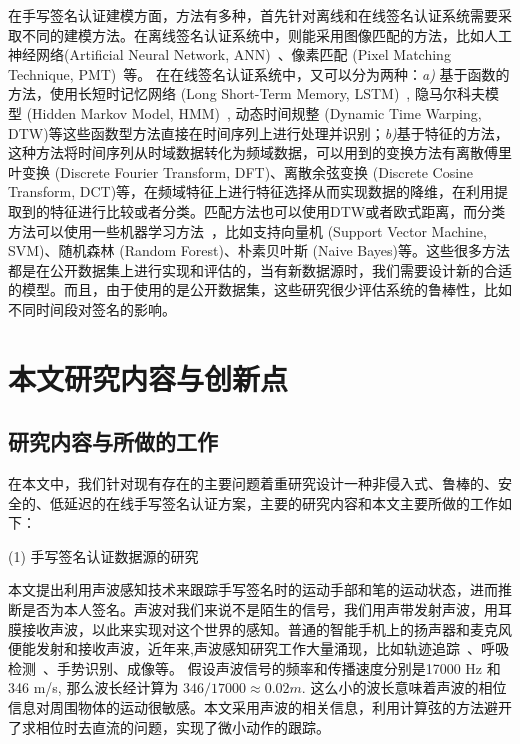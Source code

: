 在手写签名认证建模方面，方法有多种，首先针对离线和在线签名认证系统需要采取不同的建模方法。在离线签名认证系统中，则能采用图像匹配的方法，比如人工神经网络(Artificial Neural Network, ANN)~\cite{chandra2016offline}、像素匹配 (Pixel Matching Technique, PMT)~\cite{bhattacharya2013offline}等。 在在线签名认证系统中，又可以分为两种：\textit{a)} 基于函数的方法，使用长短时记忆网络 (Long Short-Term Memory, LSTM)~\cite{hochreiter1997long}, 隐马尔科夫模型 (Hidden Markov Model, HMM)~\cite{rabiner1986introduction}, 动态时间规整 (Dynamic Time Warping, DTW)等这些函数型方法直接在时间序列上进行处理并识别；\textit{b)}基于特征的方法，这种方法将时间序列从时域数据转化为频域数据，可以用到的变换方法有离散傅里叶变换 (Discrete Fourier Transform, DFT)、离散余弦变换 (Discrete Cosine Transform, DCT)等，在频域特征上进行特征选择从而实现数据的降维，在利用提取到的特征进行比较或者分类。匹配方法也可以使用DTW或者欧式距离，而分类方法可以使用一些机器学习方法~\cite{周志华2016机器学习}，比如支持向量机 (Support Vector Machine, SVM)、随机森林 (Random Forest)、朴素贝叶斯 (Naive Bayes)等。这些很多方法都是在公开数据集上进行实现和评估的，当有新数据源时，我们需要设计新的合适的模型。而且，由于使用的是公开数据集，这些研究很少评估系统的鲁棒性，比如不同时间段对签名的影响。

\section{本文研究内容与创新点}
\subsection{研究内容与所做的工作}
在本文中，我们针对现有存在的主要问题着重研究设计一种非侵入式、鲁棒的、安全的、低延迟的在线手写签名认证方案，主要的研究内容和本文主要所做的工作如下：

(1) 手写签名认证数据源的研究

本文提出利用声波感知技术来跟踪手写签名时的运动手部和笔的运动状态，进而推断是否为本人签名。声波对我们来说不是陌生的信号，我们用声带发射声波，用耳膜接收声波，以此来实现对这个世界的感知。普通的智能手机上的扬声器和麦克风便能发射和接收声波，近年来,声波感知研究工作大量涌现，比如轨迹追踪~\cite{wang2016device,mao2016cat,yun2017strata}、呼吸检测~\cite{WangContactless,wang2018c}、手势识别\cite{ruan2016audiogest,gupta2012soundwave,aumi2013doplink,ling2018ultragesture}、成像\cite{mao2017aim}等。
假设声波信号的频率和传播速度分别是17000 Hz 和 346 m/s, 那么波长经计算为  $346/17000\approx0.02m$. 这么小的波长意味着声波的相位信息对周围物体的运动很敏感。本文采用声波的相关信息，利用计算弦的方法避开了求相位时去直流的问题，实现了微小动作的跟踪。


